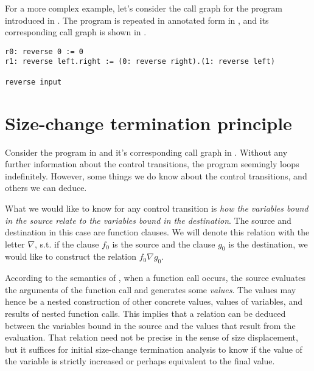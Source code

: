  

For a more complex example, let's consider the call graph for the program
 introduced in . The program is
repeated in annotated form in , and its
corresponding call graph is shown in .

\begin{lstlisting}[label=listing:cfg-reverse,caption={An annotated version of the program \mono{reverse} introduced in \referToSection{d-samples}.}]
r0: reverse 0 := 0
r1: reverse left.right := (0: reverse right).(1: reverse left)

reverse input
\end{lstlisting}

 

\section{Size-change termination principle}

Consider the program in  and it's corresponding call
graph in . Without any further information about the
control transitions, the program seemingly loops indefinitely. However,
some things we do know about the control transitions, and others we can
deduce.

What we would like to know for any control transition is \emph{how the
variables bound in the source relate to the variables bound in the
destination}. The source and destination in this case are function clauses. We
will denote this relation with the letter $\nabla$, s.t. if the clause $f_0$ is
the source and the clause $g_0$ is the destination, we would like to construct
the relation $f_0\nabla g_0$.

According to the semantics of \D{}, when a function call occurs, the source
evaluates the arguments of the function call and generates some \emph{values}.
The values may hence be a nested construction of other concrete values, values
of variables, and results of nested function calls. This implies that a
relation can be deduced between the variables bound in the source and the
values that result from the evaluation. That relation need not be precise in
the sense of size displacement, but it suffices for initial size-change
termination analysis to know if the value of the variable is strictly increased
or perhaps equivalent to the final value.


